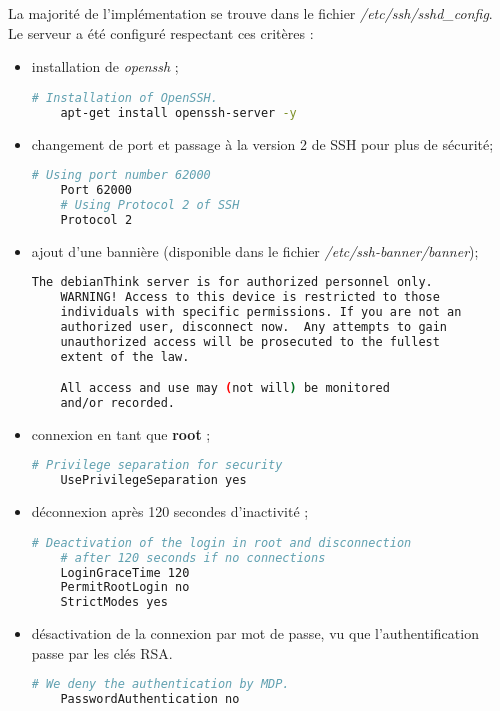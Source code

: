 La majorité de l'implémentation se trouve dans le fichier
\textit{/etc/ssh/sshd\_config}. \\
Le serveur a été configuré respectant ces critères :
\begin{itemize}
\item installation de \textit{openssh} ;

  \begin{lstlisting}[language=bash]
    # Installation of OpenSSH.
    apt-get install openssh-server -y
  \end{lstlisting}

\item changement de port et passage à la version 2 de SSH pour plus de sécurité;

  \begin{lstlisting}[language=bash]
    # Using port number 62000
    Port 62000
    # Using Protocol 2 of SSH
    Protocol 2
  \end{lstlisting}

  \newpage

\item ajout d'une bannière (disponible dans le fichier \textit{/etc/ssh-banner/banner});

  \begin{lstlisting}[language=bash]
    The debianThink server is for authorized personnel only.
    WARNING! Access to this device is restricted to those
    individuals with specific permissions. If you are not an
    authorized user, disconnect now.  Any attempts to gain
    unauthorized access will be prosecuted to the fullest
    extent of the law.

    All access and use may (not will) be monitored
    and/or recorded.
  \end{lstlisting}

\item connexion en tant que \textbf{root} ;

  \begin{lstlisting}[language=bash]
    # Privilege separation for security
    UsePrivilegeSeparation yes
  \end{lstlisting}

\item déconnexion après 120 secondes d'inactivité ;

  \begin{lstlisting}[language=bash]
    # Deactivation of the login in root and disconnection
    # after 120 seconds if no connections
    LoginGraceTime 120
    PermitRootLogin no
    StrictModes yes
  \end{lstlisting}

\item désactivation de la connexion par mot de passe, vu que l'authentification
  passe par les clés RSA.

  \begin{lstlisting}[language=bash]
    # We deny the authentication by MDP.
    PasswordAuthentication no
  \end{lstlisting}
\end{itemize}

